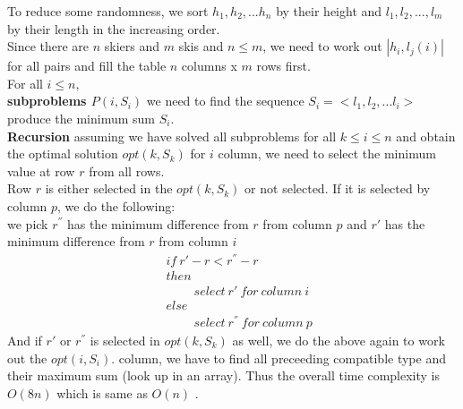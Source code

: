 \documentclass[a4paper]{scrartcl}
\begin{document}
\begin{enumerate}[label=(\alph*)]
To reduce some randomness, we sort $h_1,h_2,...h_n$ by their height and $l_1,l_2,...,l_m$ by their length in the increasing order.\\
Since there are $n$ skiers and $m$ skis and $n\leq m$, we need to work out $|h_i, l_j(i)|$ for all pairs and fill the table $n$ columns x $m$ rows first. \\
For all $i \leq n$,\\
\textbf{subproblems $P(i, S_i)$} we need to find the sequence $S_i=\big<l_1,l_2,...l_i\big>$ produce the minimum sum $S_i$.\\
\textbf{Recursion} assuming we have solved all subproblems for all $k \leq i \leq n$ and obtain the optimal solution $opt(k,S_{k})$
for $i$ column, we need to select the minimum value at row $r$ from all rows.\\
Row $r$ is either selected in the $opt(k,S_{k})$ or not selected.
If it is selected by column $p$, we do the following:\\
we pick  $r^{''}$ has the minimum difference from $r$ from column $p$ and $r'$ has the minimum difference from $r$ from column $i$
\begin{align*}
 &\ if\ r'-r <  r^{''} -r \\
 &\ then \\
 &\ \qquad\ select\ r'\ for\ column\ i\\
 &\ else \\
 &\ \qquad\ select\ r^{''}\ for\ column\ p
\end{align*}
And if $r'$ or $r^{''}$ is selected in $opt(k,S_{k})$ as well, we do the above again to work out the $opt(i,S_{i})$.
column, we have to find all preceeding compatible type and their maximum sum (look up in an array). Thus the overall time complexity is $O(8n)$ which is same as $O(n)$ .
\end{enumerate}
\end{document}
